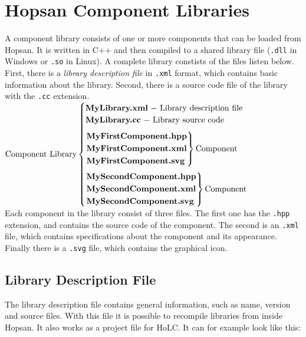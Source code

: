 \documentclass[a4paper,pdftex]{article}
\begin{document}
\section*{Hopsan Component Libraries}
A component library consists of one or more components that can be loaded from Hopsan. It is written in C++ and then compiled to a shared library file (\texttt{.dll} in Windows or \texttt{.so} in Linux). A complete library constists of the files listen below. First, there is a \textit{library description file} in \texttt{.xml} format, which contains basic information about the library. Second, there is a source code file of the library with the \texttt{.cc} extension.\vspace{10pt}\\
$\mathrm{Component\ Library} \begin{cases}
\mathtt{\textbf{MyLibrary.xml}} \mathrm{\ -\ Library\ description\ file}\\
\mathtt{\textbf{MyLibrary.cc}} \mathrm{\ -\ Library\ source\ code}\vspace{7pt} \\ 
\begin{rcases}
  \mathtt{\textbf{MyFirstComponent.hpp}} \\
  \mathtt{\textbf{MyFirstComponent.xml}} \\
  \mathtt{\textbf{MyFirstComponent.svg}}
\end{rcases} \mathrm{Component}\vspace{7pt} \\
\begin{rcases}
  \mathtt{\textbf{MySecondComponent.hpp}} \\
  \mathtt{\textbf{MySecondComponent.xml}} \\
  \mathtt{\textbf{MySecondComponent.svg}}
\end{rcases} \mathrm{Component} \\
\end{cases}$
\vspace{10pt}\\
Each component in the library consist of three files. The first one has the \texttt{.hpp} extension, and contains the source code of the component. The second is an \texttt{.xml} file, which contains specifications about the component and its appearance. Finally there is a \texttt{.svg} file, which contains the graphical icon.

\subsection*{Library Description File}
The library description file contains general information, such as name, version and source files.
With this file it is possible to recompile libraries from inside Hopsan.
It also works as a project file for HoLC.
It can for example look like this:
\end{document}
